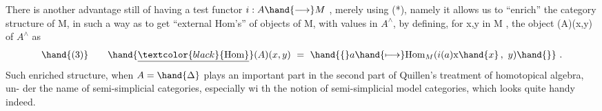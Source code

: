 There  is another advantage still of having a test functor
$i : A \hand{\longrightarrow} M$ ,   merely using (*),  namely it allows us to
``enrich''  the category structure of M,  in such a way as to get
``external Hom's''  of objects of M,  with values in $A^{\wedge}$,  by defining,
for  x,y  in M ,  the object  \hand{\uline{\textcolor{black}{Hom}}}(A)(x,y)  of $A^{\wedge}$ as
\[ \hand{(3)} \qquad \hand{\underline{\textcolor{black}{\mathrm{Hom}}}}(A)(x,y) \ = \ \hand{\{} a \hand{\longmapsto} \mathrm{Hom}_{M}(i(a) \mathrm{x}\hand{x} \, , \ y) \hand{\}} \ . \]
 Such enriched structure,  when  $A = \hand{\Delta}$\hand{\unsure{,}}  plays an important part
in the second part of Quillen's treatment of homotopical algebra,  un-%
der the name of \hand{(}semi-\hand{)}simplicial categories,  especially wi th the notion
of \hand{(}semi-\hand{)}simplicial model categories,  which looks quite handy indeed.

